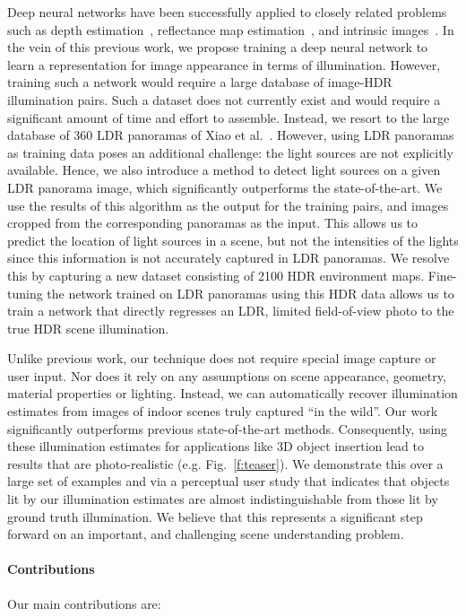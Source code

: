 Deep neural networks have been successfully applied to closely related problems such as depth estimation~\cite{eigen-iccv-15,bansal2016marr}, reflectance map estimation~\cite{rematas-cvpr-16}, and intrinsic images~\cite{zhou2015intrinsic}. In the vein of this previous work, we propose training a deep neural network to learn a representation for image appearance in terms of illumination. However, training such a network would require a large database of image-HDR illumination pairs. Such a dataset does not currently exist and would require a significant amount of time and effort to assemble. Instead, we resort to the large database of 360 LDR panoramas of Xiao et al.~. However, using LDR panoramas as training data poses an additional challenge: the light sources are not explicitly available. Hence, we also introduce a method to detect light sources on a given LDR panorama image, which significantly outperforms the state-of-the-art. We use the results of this algorithm as the output for the training pairs, and images cropped from the corresponding panoramas as the input. This allows us to predict the location of light sources in a scene, but not the intensities of the lights since this information is not accurately captured in LDR panoramas. We resolve this by capturing a new dataset consisting of 2100 HDR environment maps. Fine-tuning the network trained on LDR panoramas using this HDR data allows us to train a network that directly regresses an LDR, limited field-of-view photo to the true HDR scene illumination. 

Unlike previous work, our technique does not require special image capture or user input. Nor does it rely on any assumptions on scene appearance, geometry, material properties or lighting. Instead, we can automatically recover illumination estimates from images of indoor scenes truly captured ``in the wild''. Our work significantly outperforms previous state-of-the-art methods. Consequently, using these illumination estimates for applications like 3D object insertion lead to results that are photo-realistic (e.g. Fig.~\ref{f:teaser}). We demonstrate this over a large set of examples and via a perceptual user study that indicates that objects lit by our illumination estimates are almost indistinguishable from those lit by ground truth illumination. We believe that this represents a significant step forward on an important, and challenging scene understanding problem.

\paragraph{Contributions} Our main contributions are:

